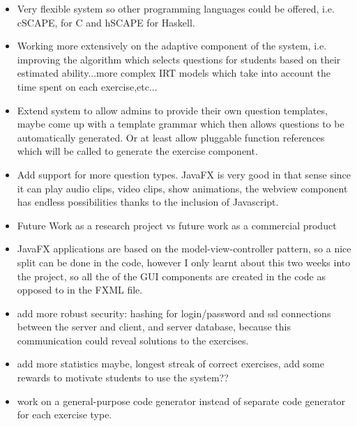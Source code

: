 \begin{itemize}
\item Very flexible system so other programming languages could be offered, i.e. cSCAPE, for C and hSCAPE for Haskell. 
\item Working more extensively on the adaptive component of the system, i.e. improving the algorithm which selects questions for students based on their estimated ability...more complex IRT models which take into account the time spent on each exercise,etc...
\item Extend system to allow admins to provide their own question templates, maybe come up with a template grammar which then allows questions to be automatically generated. Or at least allow pluggable function references which will be called to generate the exercise component.
\item Add support for more question types. JavaFX is very good in that sense since it can play audio clips, video clips, show animations, the webview component has endless possibilities thanks to the inclusion of Javascript.
\item Future Work as a research project vs future work as a commercial product
\item JavaFX applications are based on the model-view-controller pattern, so a nice split can be done in the code, however I only learnt about this two weeks into the project, so all the of the GUI components are created in the code as opposed to in the FXML file.
\item add more robust security: hashing for login/password and ssl connections between the server and client, and server database, because this communication could reveal solutions to the exercises.
\item add more statistics maybe, longest streak of correct exercises, add some rewards to motivate students to use the system??
\item work on a general-purpose code generator instead of separate code generator for each exercise type.
\end{itemize}